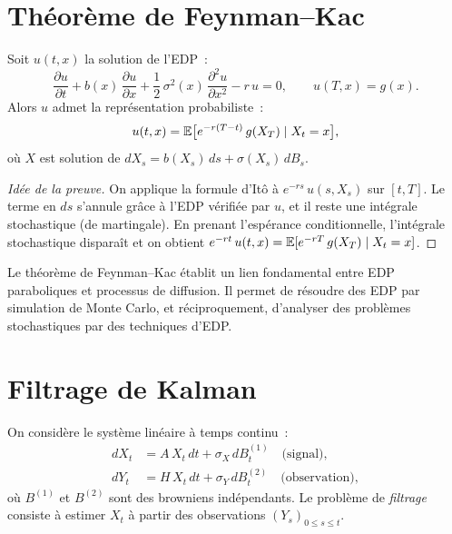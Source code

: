 \section{Th\'eor\`eme de Feynman--Kac}
\label{sec:feynman_kac}

\begin{theoreme}
\label{thm:feynman_kac}
Soit $u(t,x)$ la solution de l'EDP~:
\[
  \frac{\partial u}{\partial t} + b(x)\,\frac{\partial u}{\partial x}
  + \frac{1}{2}\,\sigma^2(x)\,\frac{\partial^2 u}{\partial x^2}
  - r\,u = 0, \qquad u(T, x) = g(x).
\]
Alors $u$ admet la repr\'esentation probabiliste~:
\[
  u(t, x) = \mathbb{E}\bigl[e^{-r(T-t)}\,g(X_T) \mid X_t = x\bigr],
\]
o\`u $X$ est solution de $dX_s = b(X_s)\,ds + \sigma(X_s)\,dB_s$.
\end{theoreme}

\begin{proof}[Id\'ee de la preuve]
On applique la formule d'It\^o \`a $e^{-rs}\,u(s, X_s)$ sur $[t, T]$.
Le terme en $ds$ s'annule gr\^ace \`a l'EDP v\'erifi\'ee par $u$,
et il reste une int\'egrale stochastique (de martingale). En prenant
l'esp\'erance conditionnelle, l'int\'egrale stochastique dispara\^it
et on obtient $e^{-rt}\,u(t, x) = \mathbb{E}[e^{-rT}\,g(X_T) \mid X_t = x]$.
\end{proof}

\begin{remarque}
Le th\'eor\`eme de Feynman--Kac \'etablit un lien fondamental entre EDP
paraboliques et processus de diffusion. Il permet de r\'esoudre des EDP
par simulation de Monte Carlo, et r\'eciproquement, d'analyser des
probl\`emes stochastiques par des techniques d'EDP.
\end{remarque}

\section{Filtrage de Kalman}
\label{sec:kalman}

\begin{definition}
On consid\`ere le syst\`eme lin\'eaire \`a temps continu~:
\begin{align*}
  dX_t &= A\,X_t\,dt + \sigma_X\,dB_t^{(1)} \quad \text{(signal)}, \\
  dY_t &= H\,X_t\,dt + \sigma_Y\,dB_t^{(2)} \quad \text{(observation)},
\end{align*}
o\`u $B^{(1)}$ et $B^{(2)}$ sont des browniens ind\'ependants.
Le probl\`eme de \emph{filtrage} consiste \`a estimer $X_t$ \`a partir
des observations $(Y_s)_{0 \leq s \leq t}$.
\end{definition}


